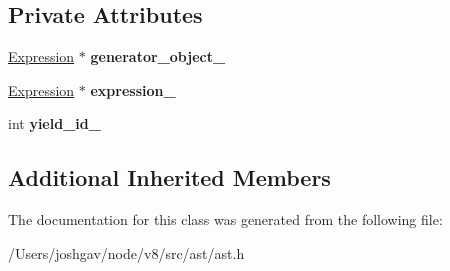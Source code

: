 \subsection*{Private Attributes}
\begin{DoxyCompactItemize}
\item 
\hyperlink{classv8_1_1internal_1_1_expression}{Expression} $\ast$ {\bfseries generator\+\_\+object\+\_\+}\hypertarget{classv8_1_1internal_1_1_yield_abbff7c95d4409aedca0c05e90e0606b7}{}\label{classv8_1_1internal_1_1_yield_abbff7c95d4409aedca0c05e90e0606b7}

\item 
\hyperlink{classv8_1_1internal_1_1_expression}{Expression} $\ast$ {\bfseries expression\+\_\+}\hypertarget{classv8_1_1internal_1_1_yield_a2f0f4bbadc0fe681432889330e5911d7}{}\label{classv8_1_1internal_1_1_yield_a2f0f4bbadc0fe681432889330e5911d7}

\item 
int {\bfseries yield\+\_\+id\+\_\+}\hypertarget{classv8_1_1internal_1_1_yield_aac734e5019aa8156bff20cdf98ae241a}{}\label{classv8_1_1internal_1_1_yield_aac734e5019aa8156bff20cdf98ae241a}

\end{DoxyCompactItemize}
\subsection*{Additional Inherited Members}


The documentation for this class was generated from the following file\+:\begin{DoxyCompactItemize}
\item 
/\+Users/joshgav/node/v8/src/ast/ast.\+h\end{DoxyCompactItemize}
